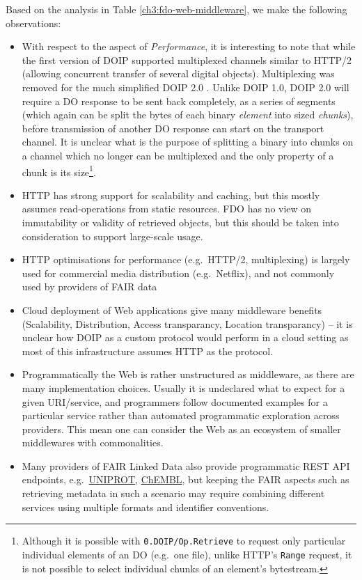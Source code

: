 Based on the analysis in Table \vref{ch3:fdo-web-middleware}, we make the following observations:

\begin{itemize}
  \item
    With respect to the aspect of \emph{Performance}, it is interesting to note that while the first version of DOIP \cite{DigitalObjectInterface} supported multiplexed channels similar to HTTP/2 (allowing concurrent transfer of several digital objects). Multiplexing was removed for the much simplified DOIP 2.0 \cite{DONA 2018}. Unlike DOIP 1.0, DOIP 2.0 will require a DO response to be sent back completely, as a series of segments (which again can be split the bytes of each binary \emph{element} into sized \emph{chunks}), before transmission of another DO response can start on the transport channel. It is unclear what is the purpose of splitting a binary into chunks on a channel which no longer can be multiplexed and the only property of a chunk is its size\footnote{Although it is possible with \texttt{0.DOIP/Op.Retrieve} to request only particular individual elements of an DO (e.g.~one file), unlike HTTP's \texttt{Range} request, it is not possible to select individual chunks of an element's bytestream.}.
  \item
    HTTP has strong support for scalability and caching, but this mostly assumes read-operations from static resources. FDO has no view on immutability or validity of retrieved objects, but this should be taken into consideration to support large-scale usage.
  \item
    HTTP optimisations for performance (e.g.~HTTP/2, multiplexing) is largely used for commercial media distribution (e.g.~Netflix), and not commonly used by providers of FAIR data
  \item
    Cloud deployment of Web applications give many middleware benefits (Scalability, Distribution, Access transparancy, Location transparancy) -- it is unclear how DOIP as a custom protocol would perform in a cloud setting as most of this infrastructure assumes HTTP as the protocol.
  \item
    Programmatically the Web is rather unstructured as middleware, as there are many implementation choices. Usually it is undeclared what to expect for a given URI/service, and programmers follow documented examples for a particular service rather than automated programmatic exploration across providers. This mean one can consider the Web as an ecosystem of smaller middlewares with commonalities.
  \item
    Many providers of FAIR Linked Data also provide programmatic REST API endpoints, e.g.~\href{https://www.uniprot.org/help/programmatic_access}{UNIPROT}, \href{https://chembl.gitbook.io/chembl-interface-documentation/web-services}{ChEMBL}, but keeping the FAIR aspects such as retrieving metadata in such a scenario may require combining different services using multiple formats and identifier conventions.
\end{itemize}


